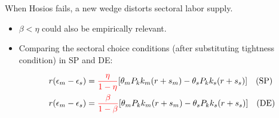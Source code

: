 \documentclass[9pt,xcolor={svgnames}]{beamer}
\begin{document}
\begin{frame}{When Hosios fails, a new wedge distorts sectoral labor supply.}\label{main:beta_eta}


\begin{itemize}


\item $\beta< \eta$ could also be empirically relevant. \hyperlink{app:beta_eta}{}



\vspace{5mm}




    \item Comparing the sectoral choice conditions (after substituting tightness condition) in SP and DE: %


   \begin{align*}
    r(\epsilon_m-\epsilon_s) &= \textcolor{red}{\frac{\eta}{1-\eta}}[\theta_mP_kk_m(r+s_m)-\theta_sP_kk_s(r+s_s)]  \quad (\text{SP}) \label{rc_sp}\\
        r(\epsilon_m-\epsilon_s) &= \textcolor{red}{\frac{\beta}{1-\beta}}[\theta_mP_kk_m(r+s_m)-\theta_sP_kk_s(r+s_s)]  \quad (\text{DE}) \label{rc_de} 
\end{align*}






\end{itemize}
\end{frame}
\end{document}
